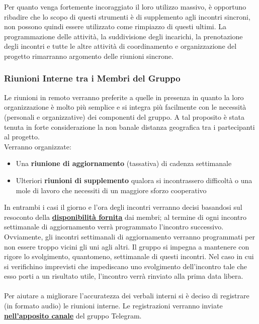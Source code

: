 \documentclass[a4paper,12pt]{article}
\begin{document}
Per quanto venga fortemente incoraggiato il loro utilizzo massivo, è opportuno ribadire che lo scopo di questi strumenti è di supplemento agli incontri sincroni, non possono quindi essere utilizzato come rimpiazzo di questi ultimi. La programmazione delle attività, la suddivisione degli incarichi, la prenotazione degli incontri e tutte le altre attività di coordinamento e organizzazione del progetto rimarranno argomento delle riunioni sincrone.

\subsubsection{Riunioni Interne tra i Membri del Gruppo} \label{subsec:riunioniInterne}
Le riunioni in remoto verranno preferite a quelle in presenza in quanto la loro organizzazione è molto più semplice e si integra più facilmente con le necessità (personali e organizzative) dei componenti del gruppo. A tal proposito è stata tenuta in forte considerazione la non banale distanza geografica tra i partecipanti al progetto. \\

Verranno organizzate:
\begin{itemize}
    \item Una \textbf{riunione di aggiornamento} (tassativa) di cadenza settimanale

    \item Ulteriori \textbf{riunioni di supplemento} qualora si incontrassero difficoltà o una mole di lavoro che necessiti di un maggiore sforzo cooperativo
\end{itemize}

In entrambi i casi il giorno e l'ora degli incontri verranno decisi basandosi sul resoconto della \textbf{\underline{\hyperref[sec:pianificazioneImpegni]{disponibilità fornita}}} dai membri; al termine di ogni incontro settimanale di aggiornamento verrà programmato l'incontro successivo. Ovviamente, gli incontri settimanali di aggiornamento verranno programmati per non essere troppo vicini gli uni agli altri. Il gruppo si impegna a mantenere con rigore lo svolgimento, quantomeno, settimanale di questi incontri. Nel caso in cui si verifichino imprevisti che impediscano uno svolgimento dell'incontro tale che esso porti a un risultato utile, l'incontro verrà rinviato alla prima data libera. \\\\
Per aiutare a migliorare l'accuratezza dei verbali interni si è deciso di registrare (in formato audio) le riunioni interne. Le registrazioni verranno inviate \textbf{\underline{\hyperref[sec:canaliTelegram]{nell'apposito canale}}} del gruppo Telegram.
\end{document}
